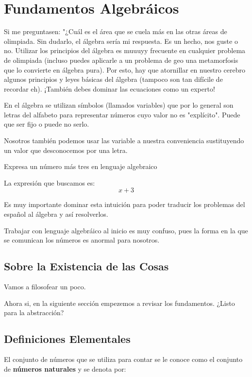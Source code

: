 \chapter{Fundamentos Algebráicos}

Si me preguntasen: "¿Cuál es el área que se cuela más en las 
otras áreas de olimpiada. Sin dudarlo, el álgebra sería mi 
respuesta. Es un hecho, nos guste o no. 
Utilizar los principios del álgebra es muuuyy frecuente 
en cualquier problema de olimpiada (incluso puedes aplicarle 
a un problema de geo una metamorfosis que lo convierte en 
álgebra pura). Por esto, hay que atornillar en nuestro 
cerebro algunos principios y leyes básicas del álgebra 
(tampoco son tan difícile de recordar eh). ¡También debes dominar 
las ecuaciones como un experto!

En el álgebra se utilizan símbolos (llamados variables) que por 
lo general son letras del alfabeto para representar números cuyo 
valor no es "explícito". Puede que ser fijo o puede no serlo.

Nosotros también podemos usar las variable a nuestra 
conveniencia sustituyendo un valor que desconocemos por una 
letra.  

\begin{example}
Expresa un número más tres en lenguaje algebraico 
\end{example}

La expresión que buscamos es:
\[x+3\]

Es muy importante dominar esta 
intuición para poder traducir los problemas del 
español al álgebra y así resolverlos. 

Trabajar con lenguaje algebráico al inicio es muy confuso, 
pues la forma en la que se comunican los números es anormal 
para nosotros. 

\section{Sobre la Existencia de las Cosas}

Vamos a filosofear un poco.


Ahora si, en la siguiente sección 
empezemos a revisar los fundamentos. 
¿Listo para la abstracción?

\section{Definiciones Elementales}

El conjunto de números que se utiliza para contar se 
le conoce como el conjunto de \textbf{números naturales} 
y se denota por: 

